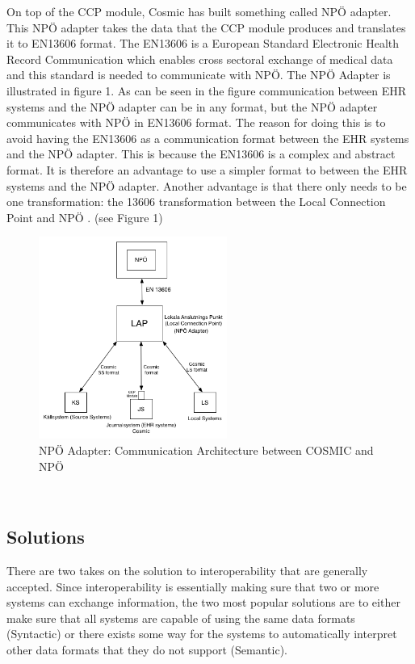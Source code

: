 \documentclass[14pt]{article}
\begin{document}
On top of the CCP module, Cosmic has built something called NPÖ adapter. This NPÖ adapter takes the data that the CCP module produces and translates it to \gls{EN13606} format. The \gls{EN13606} is a European Standard Electronic Health Record Communication which enables cross sectoral exchange of medical data and this standard is needed to communicate with NPÖ. The NPÖ Adapter is illustrated in figure 1. As can be seen in the figure communication between EHR systems and the NPÖ adapter can be in any format, but the NPÖ adapter communicates with NPÖ in \gls{EN13606} format. The reason for doing this is to avoid having the \gls{EN13606} as a communication format between the EHR systems and the NPÖ adapter. This is because the \gls{EN13606} is a complex and abstract format. It is therefore an advantage to use a simpler format to between the EHR systems and the NPÖ adapter. Another advantage is that there only needs to be one transformation: the 13606 transformation between the Local Connection Point and NPÖ  \cite{ViktorJernelov}. (see Figure 1) 

\begin{figure}[h!]
  \caption{NPÖ Adapter: Communication Architecture between COSMIC and NPÖ}
  \centering
    \includegraphics[width=0.55\textwidth]{Images/npoNewAdapt}
\end{figure}\
\label{sec:npoIntervi}

\subsection{Solutions}
\label{sec:interopSolutions}
There are two takes on the solution to interoperability that are generally accepted.  Since interoperability is essentially making sure that two or more systems can exchange information, the two most popular solutions are to either make sure that all systems are capable of using the same data formats (Syntactic) or there exists some way for the systems to automatically interpret other data formats that they do not support (Semantic).
\end{document}
